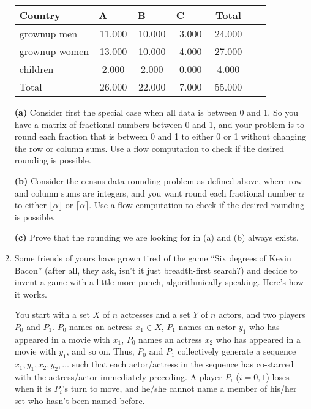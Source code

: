 \documentclass[12pt]{article}
\begin{document}
\begin{enumerate}
\begin{table}[h]
\begin{center}
\begin{tabular}{|l||c|c|c|c|c||c|}
\hline Country & A ~~~ & B ~~~  & C ~~~ & Total \\  \hline
grownup men  &  11.000 & 10.000 & 3.000& 24.000\\
grownup women &  13.000 & 10.000 & 4.000 & 27.000  \\  \hline
children &  2.000 &   2.000 & 0.000 & 4.000  \\ \hline \hline
Total &  26.000 & 22.000 & 7.000 & 55.000  \\ \hline
\end{tabular}
\end{center}
\end{table}

\medskip
{\bf (a)} Consider first the special case when all data is between 0 and 1.
So you have a matrix of fractional numbers between 0 and 1, and your
problem is to round each fraction that is between 0 and 1 to either
0 or 1 without changing the row or column sums. Use a flow computation
to check if the desired rounding is possible.

\medskip
{\bf (b)} Consider the census data rounding problem as defined above,
where row and column sums are integers, and you want round each fractional
number $\alpha$ to either $\lfloor \alpha \rfloor$ or
$\lceil \alpha \rceil$. Use a flow computation
to check if the desired rounding is possible.

\medskip
{\bf (c)} Prove that the rounding we are looking for in
(a) and (b) always exists.



\item\Star
Some friends of yours have grown tired of the
game ``Six degrees of Kevin Bacon''
(after all, they ask, isn't it just breadth-first search?)
and decide to invent a game with a little more
punch, algorithmically speaking.
Here's how it works.

You start with a set $X$ of $n$ actresses and
a set $Y$ of $n$ actors,
and two players $P_0$ and $P_1$.
$P_0$ names an actress $x_1 \in X$, $P_1$ names an actor
$y_1$ who has appeared in a movie with $x_1$,
$P_0$ names an actress $x_2$ who has appeared in a movie with $y_1$,
and so on.
Thus, $P_0$ and $P_1$ collectively generate a sequence
$x_1, y_1, x_2, y_2, \ldots$
such that each actor/actress in the sequence has co-starred
with the actress/actor immediately preceding.
A player $P_i$ ($i = 0, 1$) loses when it is $P_i$'s turn to move, and
he/she cannot name a member of his/her set who hasn't been named before.


\end{enumerate}
\end{document}
